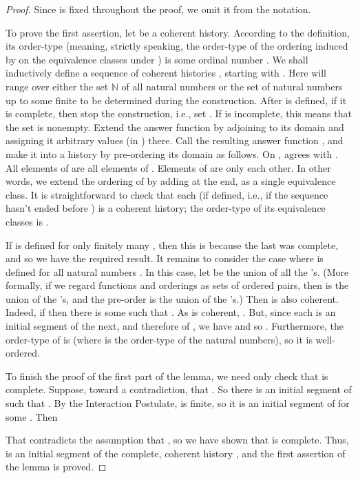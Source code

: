 \documentclass{LMCS}
\theoremstyle{definition}
\newcommand{\bbb}[1]{\ensuremath{\mathbb {#1}}}
\begin{document}
\begin{proof}
Since  is fixed throughout the proof, we omit it from the
notation.

To prove the first assertion, let  be a coherent history.
According to the definition, its order-type (meaning, strictly
speaking, the order-type of the ordering induced by  on the
equivalence classes under ) is some ordinal number
.  We shall inductively define a sequence of coherent
histories , starting with .  Here  will range
over either the set \bbb N of all natural numbers or the set of
natural numbers up to some finite  to be determined during the
construction.  After  is defined, if it is complete, then stop
the construction, i.e., set .  If  is incomplete, this
means that the set
 is
nonempty.  Extend the answer function  by adjoining 
to its domain and assigning it arbitrary values (in ) there.  Call
the resulting answer function , and make it into a
history  by pre-ordering its domain as follows. On
,  agrees with .  All
elements of  are  all elements of
.  Elements of  are  only each other.  In
other words, we extend the ordering of  by adding 
at the end, as a single equivalence class.  It is straightforward to
check that each  (if defined, i.e., if the sequence hasn't
ended before ) is a coherent history; the order-type of its
equivalence classes is .

If  is defined for only finitely many , then this is because
the last  was complete, and so we have the required result.  It
remains to consider the case where  is defined for all natural
numbers .  In this case, let  be the union of all the
's.  (More formally, if we regard functions and orderings as
sets of ordered pairs, then  is the union of the
's, and the pre-order  is the union of the
's.)  Then  is also coherent.  Indeed, if
 then there is some  such that .  As
 is coherent, .  But,
since each  is an initial segment of the next, and therefore of
, we have  and so
.  Furthermore, the order-type of
 is  (where  is the order-type of the
natural numbers), so it is well-ordered.

To finish the proof of the first part of the lemma, we need only check
that  is complete.  Suppose, toward a contradiction, that
.  So there is an initial segment  of
 such that .  By the Interaction Postulate,
 is finite, so it is an initial segment of  for some .
Then

That contradicts the assumption that , so
we have shown that  is complete.  Thus,  is an
initial segment of the complete, coherent history , and the
first assertion of the lemma is proved.


\end{proof}
\end{document}
